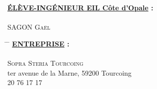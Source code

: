 \setcounter{page}{2}
\vphantom{8cm}%
\begin{center}%
%
\end{center}%
\vphantom{10pt}%
\begin{center}%
%
\end{center}%
\vphantom{10pt}%
\textbf{\underline{ÉLÈVE-INGÉNIEUR EIL Côte d'Opale} : }\\\\

\tab \tab \tab \tab \tab \textsc{\Large SAGON Gaël}%

\vspace{1cm}%
\begin{tabbing}%
\hspace{0 cm}\= \hspace{5cm} \=\kill%
\>\textbf{\underline{ENTREPRISE} :}\\\\

\> \>  \textsc{\Large Sopra Steria Tourcoing}\\%
\>  ter avenue de la Marne, 59200 Tourcoing\\%
\>  20 76 17 17\\%
\end{tabbing}%

